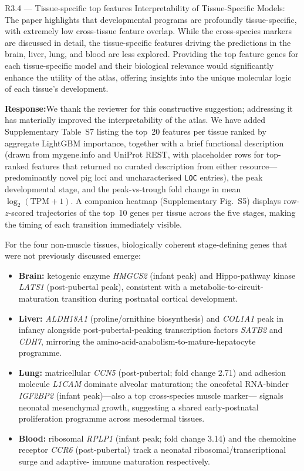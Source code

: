 \documentclass[11pt,a4paper]{article}
\newcommand{\response}[1]{%
  \par\vspace{2pt}\noindent\textbf{\textcolor{respcolor}{Response:}}\;\;#1\par\vspace{6pt}}
\begin{document}
\begin{reviewerbox}{R3.4 — Tissue-specific top features}
Interpretability of Tissue-Specific Models: The paper highlights that
developmental programs are profoundly tissue-specific, with extremely low
cross-tissue feature overlap. While the cross-species markers are discussed
in detail, the tissue-specific features driving the predictions in the brain,
liver, lung, and blood are less explored. Providing the top feature genes for
each tissue-specific model and their biological relevance would significantly
enhance the utility of the atlas, offering insights into the unique molecular
logic of each tissue's development.
\end{reviewerbox}

\response{We thank the reviewer for this constructive suggestion; addressing
it has materially improved the interpretability of the atlas. We have
added Supplementary Table~S7 listing the top~20 features per tissue ranked
by aggregate LightGBM importance, together with a brief functional
description (drawn from mygene.info and UniProt REST, with placeholder
rows for top-ranked features that returned no curated description from
either resource---predominantly novel pig loci and uncharacterised
\texttt{LOC} entries), the peak developmental stage, and the
peak-vs-trough fold change in mean $\log_2(\text{TPM}+1)$. A companion
heatmap (Supplementary Fig.~S5) displays row-$z$-scored trajectories of
the top~10 genes per tissue across the five stages, making the timing of
each transition immediately visible.

For the four non-muscle tissues, biologically coherent stage-defining
genes that were not previously discussed emerge:
\begin{itemize}[leftmargin=*, itemsep=2pt, topsep=2pt]
  \item \textbf{Brain:} ketogenic enzyme \emph{HMGCS2} (infant peak) and
        Hippo-pathway kinase \emph{LATS1} (post-pubertal peak),
        consistent with a metabolic-to-circuit-maturation transition
        during postnatal cortical development.
  \item \textbf{Liver:} \emph{ALDH18A1} (proline/ornithine biosynthesis)
        and \emph{COL1A1} peak in infancy alongside post-pubertal-peaking
        transcription factors \emph{SATB2} and \emph{CDH7}, mirroring
        the amino-acid-anabolism-to-mature-hepatocyte programme.
  \item \textbf{Lung:} matricellular \emph{CCN5} (post-pubertal; fold
        change 2.71) and adhesion molecule \emph{L1CAM} dominate
        alveolar maturation; the oncofetal RNA-binder \emph{IGF2BP2}
        (infant peak)---also a top cross-species muscle marker---
        signals neonatal mesenchymal growth, suggesting a shared
        early-postnatal proliferation programme across mesodermal
        tissues.
  \item \textbf{Blood:} ribosomal \emph{RPLP1} (infant peak; fold change
        3.14) and the chemokine receptor \emph{CCR6} (post-pubertal)
        track a neonatal ribosomal/transcriptional surge and adaptive-
        immune maturation respectively.
\end{itemize}

}
\end{document}
